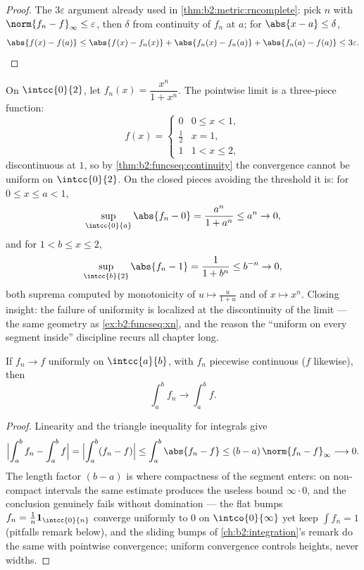 \begin{proof}
The $3\varepsilon$ argument already used in
\cref{thm:b2:metric:rncomplete}: pick $n$ with $\norm{f_n -
f}_\infty \leq \varepsilon$, then $\delta$ from continuity of
$f_n$ at $a$; for $\abs{x - a} \leq \delta$,
\[
\abs{f(x) - f(a)} \leq \abs{f(x) - f_n(x)} + \abs{f_n(x) - f_n(a)}
+ \abs{f_n(a) - f(a)} \leq 3\varepsilon . \qedhere
\]
\end{proof}

\begin{example}\label{ex:b2:funcseq:threshold}
On $\intcc{0}{2}$, let $f_n(x) = \dfrac{x^n}{1 + x^n}$. The
pointwise limit is a three-piece function:
\[
f(x) = \begin{cases} 0 & 0 \leq x < 1,\\[2pt]
\tfrac12 & x = 1,\\[2pt]
1 & 1 < x \leq 2, \end{cases}
\]
discontinuous at $1$, so by \cref{thm:b2:funcseq:continuity}
the convergence cannot be uniform on $\intcc{0}{2}$. On the
closed pieces avoiding the threshold it is: for $0 \leq x \leq
a < 1$,
\[
\sup_{\intcc{0}{a}}\abs{f_n - 0}
= \frac{a^n}{1 + a^n} \leq a^n \to 0 ,
\]
and for $1 < b \leq x \leq 2$,
\[
\sup_{\intcc{b}{2}}\abs{f_n - 1}
= \frac{1}{1 + b^n} \leq b^{-n} \to 0 ,
\]
both suprema computed by monotonicity of $u \mapsto
\frac{u}{1+u}$ and of $x \mapsto x^n$. Closing insight: the
failure of uniformity is localized at the discontinuity of the
limit --- the same geometry as \cref{ex:b2:funcseq:xn}, and the
reason the ``uniform on every segment inside'' discipline
recurs all chapter long.
\end{example}

\begin{theorem}\label{thm:b2:funcseq:integration}
If $f_n \to f$ uniformly on $\intcc{a}{b}$, with $f_n$ piecewise
continuous ($f$ likewise), then
\[
\int_a^b f_n \longrightarrow \int_a^b f .
\]
\end{theorem}

\begin{proof}
Linearity and the triangle inequality for integrals give
\[
\Bigl|\int_a^b f_n - \int_a^b f\Bigr|
= \Bigl|\int_a^b (f_n - f)\Bigr|
\leq \int_a^b\abs{f_n - f}
\leq (b - a)\,\norm{f_n - f}_\infty \longrightarrow 0 .
\]
The length factor $(b - a)$ is where compactness of the segment
enters: on non-compact intervals the same estimate produces the
useless bound $\infty\cdot0$, and the conclusion genuinely
fails without domination --- the flat bumps $f_n =
\frac1n\mathbf 1_{\intcc{0}{n}}$ converge uniformly to $0$ on
$\intco{0}{\infty}$ yet keep $\int f_n = 1$ (pitfalls remark
below), and the sliding bumps of \cref{ch:b2:integration}'s
remark do the same with pointwise convergence; uniform
convergence controls heights, never widths.
\end{proof}

